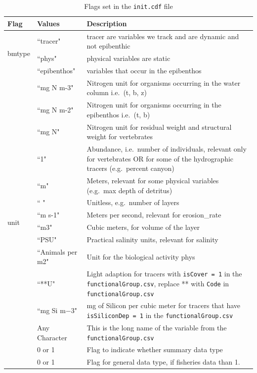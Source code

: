 \documentclass{report}
\begin{document}
\begin{center}
\begin{longtable}{llp{8cm}}
\caption{Flags set in the \texttt{init.cdf} file} \\
\hline
Flag & Values & Description \\
\hline
\multirow{3}{*}{bmtype} & ``tracer"  & tracer are variables we track and are dynamic and not epibenthic \\ 
&  ``phys" &  physical variables are static \\
& ``epibenthos" & variables that occur in the epibenthos \\
\hline
\multirow{20}{*}{unit} & ``mg N m-3" & Nitrogen unit for organisms occurring in the water column i.e.\ (t, b, z) \\
&``mg N m-2" & Nitrogen unit for organisms occurring in the epibenthos i.e.\ (t, b) \\
&``mg N" & Nitrogen unit for residual weight and structural weight for vertebrates \\
&``1" & Abundance, i.e.\ number of individuals, relevant only for vertebrates OR for some of the hydrographic tracers (e.g.\ percent canyon) \\
&``m" & Meters, relevant for some physical variables (e.g.\ max depth of detritus) \\
&`` " & Unitless, e.g.\ number of layers \\
&``m s-1" & Meters per second, relevant for erosion\_rate \\
&``m3" & Cubic meters, for volume of the layer \\
&``PSU" & Practical salinity units, relevant for salinity \\
&``Animals per m2" & Unit for the biological activity phys \\
&``**U" & Light adaption for tracers with \texttt{isCover = 1} in the \texttt{functionalGroup.csv}, replace ** with \texttt{Code} in \texttt{functionalGroup.csv}  \\
&``mg Si m$-$3" & mg of Silicon per cubic meter for tracers that have \texttt{isSiliconDep = 1} in the \texttt{functionalGroup.csv} \\
\hline
long\_name & Any Character & This is the long name of the variable from the \texttt{functionalGroup.csv} \\
\hline
sumtype & 0 or 1  & Flag to indicate whether summary data type  \\
\hline
dtype & 0 or 1 & Flag for general data type, if fisheries data than 1. \\

\end{longtable}
\end{center}
\end{document}

